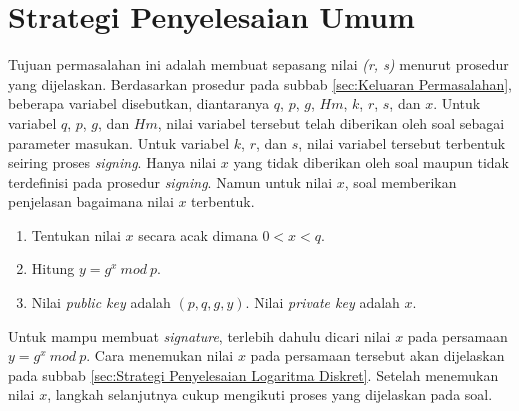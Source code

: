 \section {Strategi Penyelesaian Umum}
Tujuan permasalahan ini adalah membuat sepasang nilai \textit{(r, s)} menurut prosedur yang dijelaskan. Berdasarkan prosedur pada subbab \ref{sec:Keluaran Permasalahan}, beberapa variabel disebutkan, diantaranya $q$, $p$, $g$, $Hm$, $k$, $r$, $s$, dan $x$. Untuk variabel $q$, $p$, $g$, dan $Hm$, nilai variabel tersebut telah diberikan oleh soal sebagai parameter masukan. Untuk variabel $k$, $r$, dan $s$, nilai variabel tersebut terbentuk seiring proses \textit{signing}. Hanya nilai $x$ yang tidak diberikan oleh soal maupun tidak terdefinisi pada prosedur \textit{signing}. Namun untuk nilai $x$, soal memberikan penjelasan bagaimana nilai $x$ terbentuk.
\begin{enumerate}
\item Tentukan nilai $x$ secara acak dimana $0 < x < q$.
\item Hitung $y = g^x\ mod\ p$.
\item Nilai \textit{public key} adalah $(p, q, g, y)$. Nilai \textit{private key} adalah $x$.
\end{enumerate}
Untuk mampu membuat \textit{signature}, terlebih dahulu dicari nilai $x$ pada persamaan $y=g^x\ mod\ p$. Cara menemukan nilai $x$ pada persamaan tersebut akan dijelaskan pada subbab \ref{sec:Strategi Penyelesaian Logaritma Diskret}. Setelah menemukan nilai $x$, langkah selanjutnya cukup mengikuti proses yang dijelaskan pada soal.

